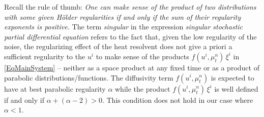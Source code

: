 \documentclass[JEP,XML,SOM,Unicode,published]{cedram}
\theoremstyle{definition}
\begin{document}
Recall the rule of thumb: \emph{One can make sense of the product of two distributions with some given Hölder regularities if and only if the sum of their regularity exponents is positive.} The term \emph{singular} in the expression \emph{singular stochastic partial differential equation} refers to the fact that, given the low regularity of the noise, the regularizing effect of the heat resolvent does not give a priori a sufficient regularity to the $u^i$ to make sense of the products $f(u^i,\mu_t^n)\,\xi^i$ in \eqref{EqMainSystem} -- neither as a space product at any fixed time or as a product of parabolic distributions/functions. The diffusivity term $f(u^i,\mu_t^n)$ is expected to have at best parabolic regularity $\alpha$ while the product $f(u^i,\mu_t^n)\,\xi^i$ is well defined if and only if $\alpha+(\alpha-2)>0$. This condition does not hold in our case where $\alpha<1$.
\end{document}
